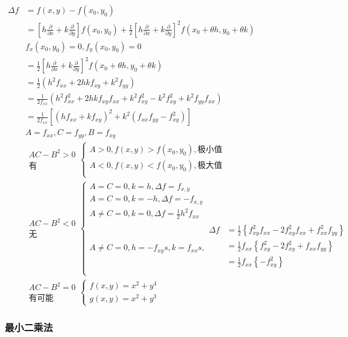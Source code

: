 \documentclass[UTF8]{ctexart}
\newcommand{\mt}[1]{\text{#1}}
\newcommand{\mf}[1]{\left( #1\right)}
\newcommand{\mfb}[1]{\left\{ #1\right\}}
\newcommand{\mfc}[1]{\left[ #1 \right]}
\newcommand{\ma}[1]{\begin{array}{llll} #1 \end{array}}
\newcommand{\da}[2]{\frac{\partial #1}{\partial #2}}
\newcommand{\fcz}[1] {
    \left\{
        \begin{array}{llll} #1 \end{array}
    \right.
}
\begin{document}
$\ma{
    \Delta f 
    &=f\mf{x,y}-f\mf{x_0,y_0}\\
    &=\mfc{h\da{}{x}+k\da{}{y}}f\mf{x_0,y_0}+\frac{1}{2}\mfc{h\da{}{x}+k\da{}{y}}^2f\mf{x_0+\theta h,y_0+\theta k}\\
    &f_x\mf{x_0,y_0}=0,f_y\mf{x_0,y_0}=0\\
    &=\frac{1}{2}\mfc{h\da{}{x}+k\da{}{y}}^2f\mf{x_0+\theta h,y_0+\theta k}\\
    &=\frac{1}{2}\mf{h^2f_{xx}+2hkf_{xy}+k^2f_{yy}}\\
    &=\frac{1}{2f_{xx}}\mf{h^2f_{xx}^2+2hkf_{xy}f_{xx}+k^2f_{xy}^2-k^2f_{xy}^2+k^2f_{yy}f_{xx}}\\
    &=\frac{1}{2f_{xx}}\mfc{ \mf{hf_{xx}+kf_{xy}}^2+k^2\mf{f_{xx}f_{yy}-f_{xy}^2}}\\
    &A=f_{xx},C=f_{yy},B=f_{xy}\\
    &\ma{AC-B^2>0\\ \mt{有}}\fcz{A>0,f\mf{x,y}>f\mf{x_0,y_0},\mt{极小值}\\
        A<0,f\mf{x,y}<f\mf{x_0,y_0},\mt{极大值}\\}\\
    &\ma{AC-B^2<0\\ \mt{无}}\fcz{
        A=C=0,k=h,\Delta f=f_{x,y}\\
        A=C=0,k=-h,\Delta f=-f_{x,y}\\
        A\neq C=0,k=0,\Delta f=\frac{1}{2}h^2f_{xx}\\
        A\neq C=0,h=-f_{xy}s,k=f_{xx}s,
        \ma{\Delta f &=\frac{1}{2}\mfb{f_{xy}^2f_{xx}-2f_{xy}^2f_{xx}+f_{xx}^2f_{yy}}\\
            &=\frac{1}{2}f_{xx}\mfb{f_{xy}^2-2f_{xy}^2+f_{xx}f_{yy}}\\
            &=\frac{1}{2}f_{xx}\mfb{ -f_{xy}^2 }\\
         }
    }\\
    &\ma{AC-B^2=0\\ \mt{有可能}}\fcz{
        f\mf{x,y}=x^2+y^4\\
        g\mf{x,y}=x^2+y^3
    }
}$


\subsubsection{最小二乘法}
\end{document}
